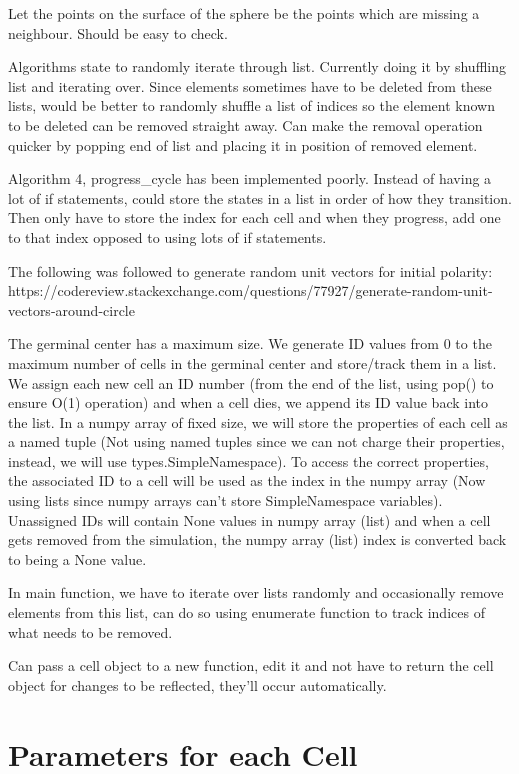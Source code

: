 \documentclass[english]{article}
\begin{document}
Let the points on the surface of the sphere be the points which are missing a neighbour. Should be easy to check.

Algorithms state to randomly iterate through list. Currently doing it by shuffling list and iterating over. Since elements sometimes have to be deleted from these lists, would be better to randomly shuffle a list of indices so the element known to be deleted can be removed straight away. Can make the removal operation quicker by popping end of list and placing it in position of removed element. 

Algorithm 4, progress\_cycle has been implemented poorly. Instead of having a lot of if statements, could store the states in a list in order of how they transition. Then only have to store the index for each cell and when they progress, add one to that index opposed to using lots of if statements. 

The following was followed to generate random unit vectors for initial polarity: https://codereview.stackexchange.com/questions/77927/generate-random-unit-vectors-around-circle

The germinal center has a maximum size. We generate ID values from 0 to the maximum number of cells in the germinal center and store/track them in a list. We assign each new cell an ID number (from the end of the list, using pop() to ensure O(1) operation) and when a cell dies, we append its ID value back into the list. In a numpy array of fixed size, we will store the properties of each cell as a named tuple (Not using named tuples since we can not charge their properties, instead, we will use types.SimpleNamespace). To access the correct properties, the associated ID to a cell will be used as the index in the numpy array (Now using lists since numpy arrays can't store SimpleNamespace variables). Unassigned IDs will contain None values in numpy array (list) and when a cell gets removed from the simulation, the numpy array (list) index is converted back to being a None value. 

In main function, we have to iterate over lists randomly and occasionally remove elements from this list, can do so using enumerate function to track indices of what needs to be removed. 

Can pass a cell object to a new function, edit it and not have to return the cell object for changes to be reflected, they'll occur automatically. 



\section{Parameters for each Cell}
\end{document}
